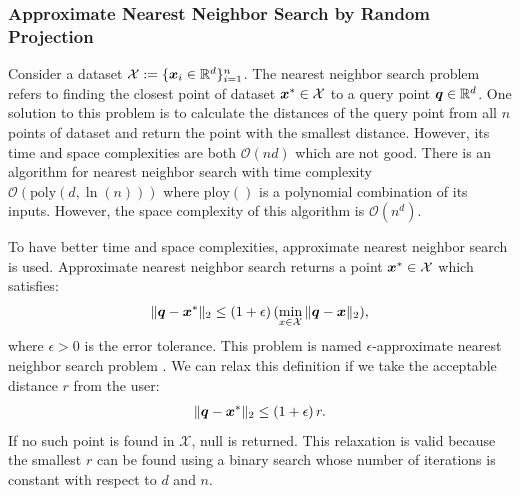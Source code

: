 \documentclass{article}
\def\b{\ensuremath\boldsymbol}
\begin{document}
\subsubsection{Approximate Nearest Neighbor Search by Random Projection}

Consider a dataset $\mathcal{X} := \{\b{x}_i \in \mathbb{R}^d\}_{i=1}^n$. 
The nearest neighbor search problem refers to finding the closest point of dataset $\b{x}^* \in \mathcal{X}$ to a query point $\b{q} \in \mathbb{R}^d$.
One solution to this problem is to calculate the distances of the query point from all $n$ points of dataset and return the point with the smallest distance. However, its time and space complexities are both $\mathcal{O}(nd)$ which are not good. There is an algorithm for nearest neighbor search \cite{meiser1993point} with time complexity $\mathcal{O}(\text{poly}(d, \ln(n)))$ where $\text{ploy}()$ is a polynomial combination of its inputs. However, the space complexity of this algorithm is $\mathcal{O}(n^d)$. 

To have better time and space complexities, approximate nearest neighbor search is used. Approximate nearest neighbor search returns a point $\b{x}^* \in \mathcal{X}$ which satisfies:
\begin{align}
\|\b{q} - \b{x}^*\|_2 \leq (1 + \epsilon)\, (\min_{x \in \mathcal{X}} \|\b{q} - \b{x}\|_2),
\end{align}
where $\epsilon >0$ is the error tolerance. This problem is named $\epsilon$-approximate nearest neighbor search problem \cite{andoni2006near}.
We can relax this definition if we take the acceptable distance $r$ from the user:
\begin{align}\label{equation_approx_knn_with_r}
\|\b{q} - \b{x}^*\|_2 \leq (1 + \epsilon)\, r.
\end{align}
If no such point is found in $\mathcal{X}$, null is returned. 
This relaxation is valid because the smallest $r$ can be found using a binary search whose number of iterations is constant with respect to $d$ and $n$. 
\end{document}
